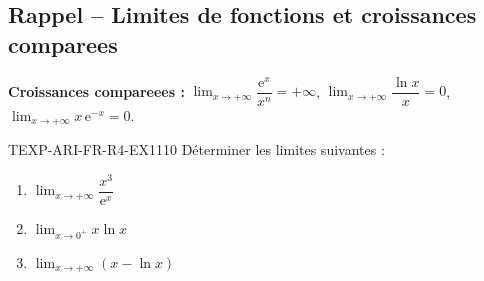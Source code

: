 

\subsection*{Rappel -- Limites de fonctions et croissances comparees}

\textbf{Croissances compareees :} $\lim_{x \to +\infty} \dfrac{\mathrm{e}^x}{x^n} = +\infty$, $\lim_{x \to +\infty} \dfrac{\ln x}{x} = 0$, $\lim_{x \to +\infty} x\,\mathrm{e}^{-x} = 0$.

\begin{exercice}{TEXP-ARI-FR-R4-EX1}{1}{10}
Déterminer les limites suivantes :
\begin{enumerate}
  \item $\lim_{x \to +\infty} \dfrac{x^3}{\mathrm{e}^x}$
  \item $\lim_{x \to 0^+} x \ln x$
  \item $\lim_{x \to +\infty} \left(x - \ln x\right)$
\end{enumerate}
\end{exercice}


